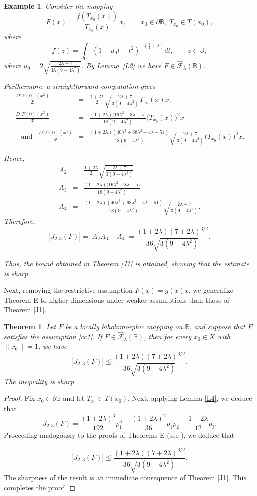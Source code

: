 \documentclass[11pt, reqno]{amsart}
\newtheorem{theo}{Theorem}[section]
\newtheorem{exm}{Example}[section]
\numberwithin{equation}{section}
\newcommand{\beas}{\begin{eqnarray*}}
\newcommand{\eeas}{\end{eqnarray*}}
\begin{document}
\begin{exm}
Consider the mapping
\[
F(x)=
\frac{f\!\left(T_{x_0}(x)\right)}{T_{x_0}(x)}\,x,
\qquad
x_0\in\partial\mathbb{B},\;
T_{x_0}\in T(x_0),
\]
where
\[
f(z)=\int_{0}^z(1-u_0t+t^2)^{-\left(\frac{1}{2}+\lambda\right)}dt, 
\qquad z\in\mathbb{U},
\]
where $u_0=2\sqrt{\frac{2\lambda+7}{3\lambda(9-4\lambda^2)}}$. 
By Lemma~\ref{L2} we have $F\in \widehat{\mathcal{F}}_{\lambda}(\mathbb{B})$. 


Furthermore, a straightforward computation gives
\beas
\frac{D^2F(0)(x^2)}{2!}&=&\frac{1+2\lambda}{2}\sqrt{\frac{2\lambda+7}{3(9-4\lambda^2)}}T_{x_0}(x)x,\\
\frac{D^3F(0)(x^3)}{3!}
&=&\frac{(1+2\lambda)\bigl(16\lambda^2+8\lambda-5\bigr)}{18(9-4\lambda^2)}\bigl(T_{x_0}(x)\bigr)^2x\\
\;\;\;\text{and}\;\;\;\frac{D^4F(0)(x^4)}{4!}&=&\frac{(1+2\lambda)\left(40\lambda^3+68\lambda^2-4\lambda-51\right)}{18(9-4\lambda^2)} \sqrt{\frac{2\lambda+7}{3(9-4\lambda^2)}}\bigl(T_{x_0}(x)\bigr)^3x.
\eeas

Hence,
\beas
A_2&=&\frac{1+2\lambda}{2}\sqrt{\frac{2\lambda+7}{3(9-4\lambda^2)}}\\
A_3&=&\frac{(1+2\lambda)\bigl(16\lambda^2+8\lambda-5\bigr)}{18(9-4\lambda^2)}\\
A_4&=&\frac{(1+2\lambda)\left(40\lambda^3+68\lambda^2-4\lambda-51\right)}{18(9-4\lambda^2)}\sqrt{\frac{2\lambda+7}{3(9-4\lambda^2)}}.
\eeas
Therefore,
\[
|J_{2,3}(F)|
=|A_2A_3-A_4|
=\frac{(1+2\lambda)(7+2\lambda)^{3/2}}{36\sqrt{3(9-4\lambda^2)}}.\]

Thus, the bound obtained in Theorem \ref{J1} is attained, showing that the estimate is sharp.
\end{exm}

Next, removing the restrictive assumption $F(x)=g(x)x$, we generalize Theorem E to higher dimensions under weaker assumptions than those of Theorem \ref{J1}. 
\begin{theo}\label{J2}
Let $F$ be a locally biholomorphic mapping on $\mathbb{B}$, and suppose that $F$ satisfies the assumption \eqref{cc1}. If $F\in \widehat{\mathcal{F}}_{\lambda}(\mathbb{B})$, then for every $x_0\in X$ with $\|x_0\|=1$, we have
\[
|J_{2,3}(F)|\leq \frac{(1+2\lambda)(7+2\lambda)^{3/2}}{36\sqrt{3(9-4\lambda^2)}}.
\] 
 The inequality is sharp.
\end{theo}
\begin{proof} Fix $x_0\in \partial{\mathbb{B}}$ and let $T_{x_0}\in T(x_0)$. Next, applying Lemma \ref{L4}, we deduce that 
\[J_{2,3}(F)=\frac{(1+2\lambda)^3}{192}p_1^3-\frac{(1+2\lambda)^2}{36}p_1p_2-\frac{1+2\lambda}{12}p_3.\]
Proceeding analogously to the proofs of Theorems E (see \cite[Theorem 6.1]{ALT2022}), we deduce that

\[
|J_{2,3}(F)|\leq \frac{(1+2\lambda)(7+2\lambda)^{3/2}}{36\sqrt{3(9-4\lambda^2)}}.
\]
 The sharpness of the result is an immediate consequence of Theorem \ref{J1}. This completes the proof.
\end{proof}
\end{document}

